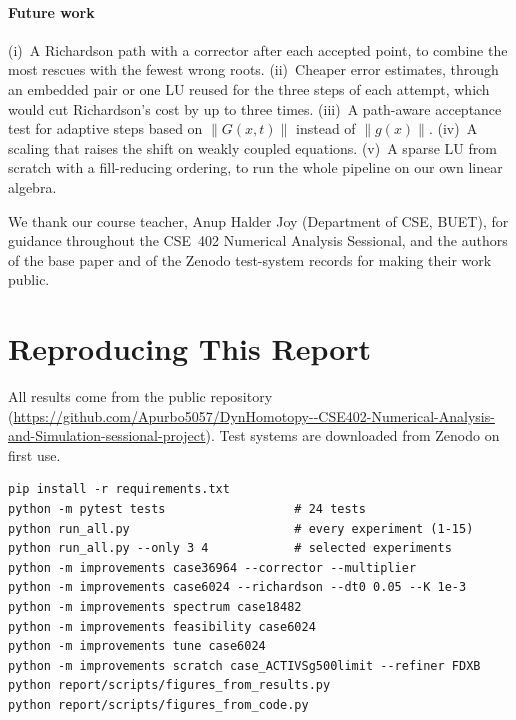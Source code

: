 \documentclass[sigconf,nonacm]{acmart}
\newcommand{\norm}[1]{\lVert #1\rVert}
\newcommand{\repo}{\url{https://github.com/Apurbo5057/DynHomotopy--CSE402-Numerical-Analysis-and-Simulation-sessional-project}}
\begin{document}
\paragraph{Future work} (i)~A Richardson path with a corrector after each accepted point, to combine the
most rescues with the fewest wrong roots. (ii)~Cheaper error estimates, through an embedded pair or one LU
reused for the three steps of each attempt, which would cut Richardson's cost by up to three times. (iii)~A
path-aware acceptance test for adaptive steps based on $\norm{G(x,t)}$ instead of $\norm{g(x)}$. (iv)~A scaling
that raises the shift on weakly coupled equations. (v)~A sparse LU from scratch with a fill-reducing ordering,
to run the whole pipeline on our own linear algebra.

\begin{acks}
We thank our course teacher, Anup Halder Joy (Department of CSE, BUET), for guidance throughout the CSE~402
Numerical Analysis Sessional, and the authors of the base paper and of the Zenodo test-system records for
making their work public.
\end{acks}




\clearpage
\onecolumn
\appendix
\section{Reproducing This Report}\label{app:repro}
All results come from the public repository~\cite{ourrepo} (\repo). Test systems are downloaded from Zenodo
on first use.
\begin{lstlisting}[style=sh]
pip install -r requirements.txt
python -m pytest tests                  # 24 tests
python run_all.py                       # every experiment (1-15)
python run_all.py --only 3 4            # selected experiments
python -m improvements case36964 --corrector --multiplier
python -m improvements case6024 --richardson --dt0 0.05 --K 1e-3
python -m improvements spectrum case18482
python -m improvements feasibility case6024
python -m improvements tune case6024
python -m improvements scratch case_ACTIVSg500limit --refiner FDXB
python report/scripts/figures_from_results.py
python report/scripts/figures_from_code.py
\end{lstlisting}
\end{document}
